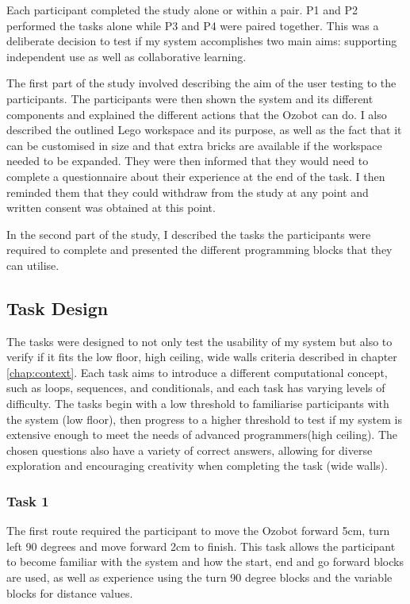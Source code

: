 \documentclass[oneside,%
                    author={Malak Hajji},
                    degree={BSc},
                    title={Designing An Accessible Computational Toolkit For Students},
                  subtitle={With Mixed Visual Abilities}]{dissertation}
\begin{document}
Each participant completed the study alone or within a pair. P1 and P2 performed the tasks alone while P3 and P4 were paired together. This was a deliberate decision to test if my system accomplishes two main aims: supporting independent use as well as collaborative learning. 

The first part of the study involved describing the aim of the user testing to the participants. The participants were then shown the system and its different components and explained the different actions that the Ozobot can do. I also described the outlined Lego workspace and its purpose, as well as the fact that it can be customised in size and that extra bricks are available if the workspace needed to be expanded. They were then informed that they would need to complete a questionnaire about their experience at the end of the task. I then reminded them that they could withdraw from the study at any point and written consent was obtained at this point.

In the second part of the study, I described the tasks the participants were required to complete and presented the different programming blocks that they can utilise. 

\subsection{Task Design}
The tasks were designed to not only test the usability of my system but also to verify if it fits the low floor, high ceiling, wide walls criteria \cite{CB-lowfloor} described in chapter \ref{chap:context}. Each task aims to introduce a different computational concept, such as loops, sequences, and conditionals, and each task has varying levels of difficulty. The tasks begin with a low threshold to familiarise participants with the system (low floor), then progress to a higher threshold to test if my system is extensive enough to meet the needs of advanced programmers(high ceiling). The chosen questions also have a variety of correct answers, allowing for diverse exploration and encouraging creativity when completing the task (wide walls).

\subsubsection{Task 1}

The first route required the participant to move the Ozobot forward 5cm, turn left 90 degrees and move forward 2cm to finish. This task allows the participant to become familiar with the system and how the start, end and go forward blocks are used, as well as experience using the turn 90 degree blocks and the variable blocks for distance values.
\end{document}

